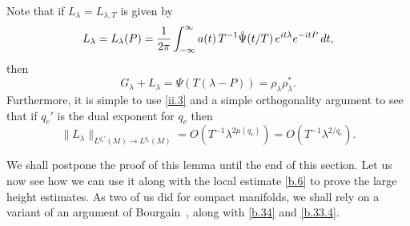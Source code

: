 \documentclass[10pt]{amsart}
\newcommand{\la}{\lambda}
\newcommand{\1}{{\bf 1}}
\begin{document}
Note that if $L_\la=L_{\la,T}$ is given by
\begin{equation}\label{b.33.2}
L_\la =L_\la(P)=\frac1{2\pi}\int_{-\infty}^\infty
a(t) \, T^{-1}\Hat \Psi(t/T) \, e^{it\la}
e^{-itP} \, dt,
\end{equation}
then
\begin{equation}\label{b.33.3}
G_\la+L_\la =\Psi(T(\la-P))=\rho_\la\rho^*_\la.
\end{equation}
Furthermore, it is simple to use \eqref{ii.3}
and a simple orthogonality argument to see
that if $q_c'$ is the dual exponent for $q_c$ then
\begin{equation}\label{b.33.4}
\|L_\la\|_{L^{q_c'}(M)\to L^{q_c}(M)}=O(T^{-1}
\la^{2\mu(q_c)})=O(T^{-1}\la^{2/q_c}).
\end{equation}


We shall postpone the proof of this lemma until the 
end of this section.   Let us now see how we can use it
along with the local estimate \eqref{b.6} to prove
the large height estimates.  As two of us did for compact
manifolds, we shall rely on a variant of an argument of 
Bourgain~\cite{BourgainBesicovitch}, along
with
\eqref{b.34} and \eqref{b.33.4}.
\end{document}

